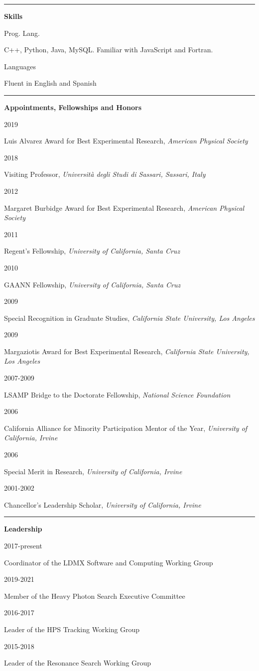 \documentclass[11pt]{article}
\newcommand{\cvsection}[1] {
    \noindent
    \textcolor{indigodye}{\rule{.15\textwidth}{.1in} \hspace{0.01 \textwidth} \textbf{\Large{#1}}} \newline 
}
\newcommand{\experienceentry}[5] { 
    \noindent
    \begin{minipage}[t]{0.84\textwidth} 
      \textbf{#1, #2}
    \end{minipage} \\[0.01pt]
    \begin{minipage}[t]{0.15\textwidth} \begin{flushright} #3 \end{flushright} \end{minipage} \hspace{0.01\textwidth}
    \begin{minipage}[t]{0.84\textwidth} 
      \textbf{\textcolor{indigodye}{#4}} \vspace{5pt} %
    \end{minipage} 
    #5 \vspace{11pt}
}
\newcommand{\skillsentry}[2] { 
    \noindent
    \begin{minipage}[t]{0.15\textwidth} \begin{flushright} #1 \end{flushright} \end{minipage} \hspace{0.01\textwidth}
    \begin{minipage}[t]{0.84\textwidth} #2 \end{minipage}
}
\newcommand{\awardentry}[3] { 
    \noindent
    \begin{minipage}[t]{0.15\textwidth} \begin{flushright} #1 \end{flushright} \end{minipage} \hspace{0.01\textwidth}
    \begin{minipage}[t]{0.84\textwidth} #2,  \emph{#3} 
    \end{minipage}
}
\newcommand{\leadentry}[2] { 
    \noindent
    \begin{minipage}[t]{0.15\textwidth} \begin{flushright} #1 \end{flushright} \end{minipage} \hspace{0.01\textwidth}
    \begin{minipage}[t]{0.84\textwidth} #2
    \end{minipage}
}
\begin{document}
    
    \cvsection{Skills}
        \skillsentry{Prog. Lang.}{C++, Python,  Java, MySQL. Familiar with JavaScript and Fortran.} 
        \skillsentry{Languages}{Fluent in English and Spanish}

    \cvsection{Appointments, Fellowships and Honors}
        \awardentry{2019}{Luis Alvarez Award for Best Experimental Research}{American Physical Society}
        \awardentry{2018}{Visiting Professor}{Università degli Studi di Sassari, Sassari, Italy}
        \awardentry{2012}{Margaret Burbidge Award for Best Experimental Research}{American Physical Society} 
        \awardentry{2011}{Regent's Fellowship}{University of California, Santa Cruz}
        \awardentry{2010}{GAANN Fellowship}{University of California, Santa Cruz}
        \awardentry{2009}{Special Recognition in Graduate Studies}
                         {California State University, Los Angeles}
        \awardentry{2009}{Margaziotis Award for Best Experimental Research}
                         {California State University, Los Angeles}
        \awardentry{2007-2009}{LSAMP Bridge to the Doctorate Fellowship}
                              {National Science Foundation} 
        \awardentry{2006}{California Alliance for Minority Participation Mentor of the Year}
                         {University of California, Irvine}
        \awardentry{2006}{Special Merit in Research}
                         {University of California, Irvine}
        \awardentry{2001-2002}{Chancellor's Leadership Scholar}
                         {University of California, Irvine}

    \cvsection{Leadership}
        \leadentry{2017-present}{Coordinator of the LDMX Software and Computing Working Group}
        \leadentry{2019-2021}{Member of the Heavy Photon Search Executive Committee}
        \leadentry{2016-2017}{Leader of the HPS Tracking Working Group}
        \leadentry{2015-2018}{Leader of the Resonance Search Working Group}
\end{document}
